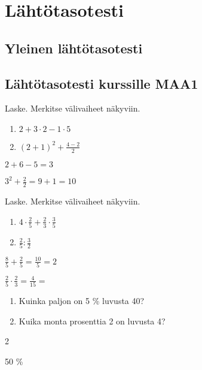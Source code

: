 \chapter{Lähtötasotesti}


\section*{Yleinen lähtötasotesti}

\section*{Lähtötasotesti kurssille MAA1}

\begin{tehtava}
Laske. Merkitse välivaiheet näkyviin. 
\begin{enumerate}
\item $2+3\cdot 2-1\cdot5$
\item $(2+1)^2+\frac{4-2}{2}$
\end{enumerate}
\begin{vastaus}
\item $2+6-5=3$
\item $3^2+\frac{2}{2}=9+1=10$
\end{vastaus}
\end{tehtava}

\begin{tehtava}
Laske. Merkitse välivaiheet näkyviin. 
\begin{enumerate}
\item $4\cdot \frac{2}{5} + \frac{2}{3}\cdot \frac{3}{5}$
\item $\frac{2}{5} : \frac{3}{2}$
\end{enumerate}
\begin{vastaus}
\item $\frac{8}{5} + \frac{2}{5}=\frac{10}{5} = 2$
\item $\frac{2}{5} \cdot \frac{2}{3}=\frac{4}{15}=$
\end{vastaus}
\end{tehtava}

\begin{tehtava}
\begin{enumerate}
\item Kuinka paljon on 5 \% luvusta 40?
\item Kuika monta prosenttia 2 on luvusta 4?
\end{enumerate}
\begin{vastaus}
\item 2
\item 50 \%
\end{vastaus}
\end{tehtava}

